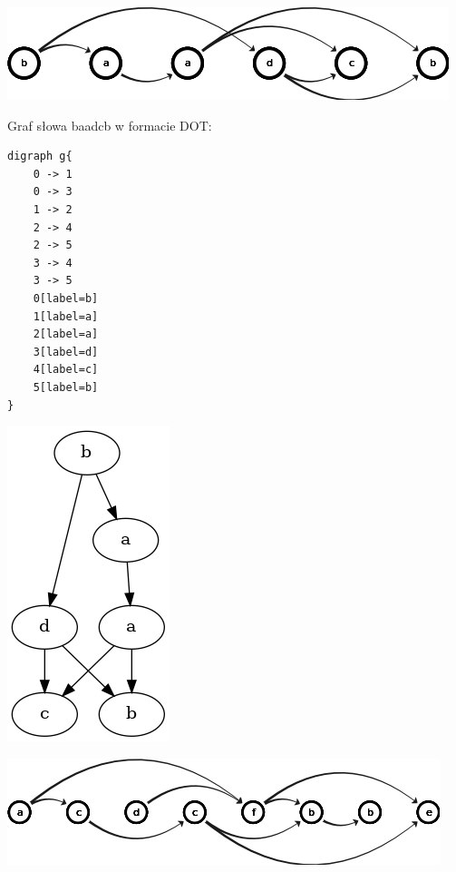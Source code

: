 \documentclass[12pt]{article}
\begin{document}
\begin{center}
\centering
    \includegraphics[scale=0.8]{baadcb_graph_reduced.png}
\end{center}

\newpage
\noindent
Graf słowa baadcb w formacie DOT:
\begin{verbatim}
digraph g{
	0 -> 1
	0 -> 3
	1 -> 2
	2 -> 4
	2 -> 5
	3 -> 4
	3 -> 5
	0[label=b]
	1[label=a]
	2[label=a]
	3[label=d]
	4[label=c]
	5[label=b]
}
\end{verbatim}

\begin{center}
\centering
    \includegraphics[scale=0.5]{baadcb_dot.png}
\end{center}

\vspace{0.5cm}

\begin{center}
\centering
    \includegraphics[scale=0.8]{acdcfbbe_graph_reduced.png}
\end{center}
\end{document}
